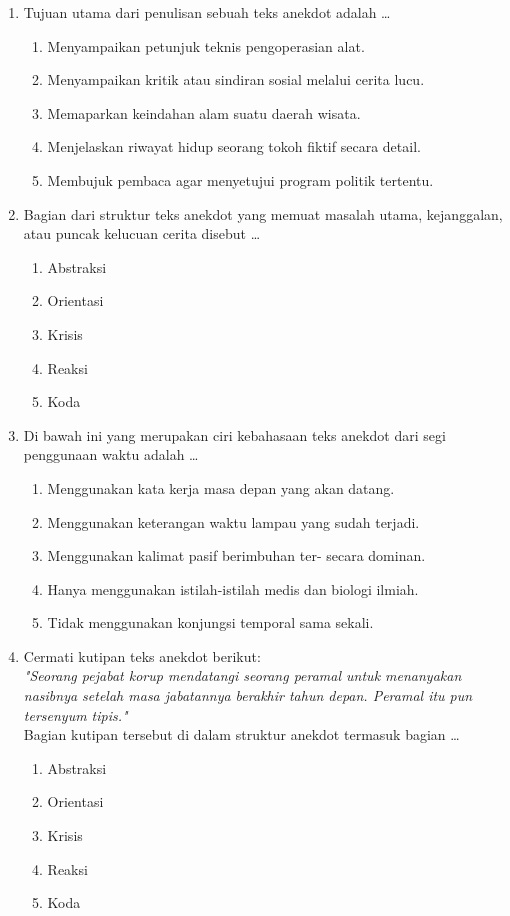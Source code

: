 \documentclass[12pt,a4paper]{article}
\begin{document}
\begin{enumerate}[leftmargin=*]

\item Tujuan utama dari penulisan sebuah teks anekdot adalah \dots
    \begin{enumerate}[label=\alph*.]
        \item Menyampaikan petunjuk teknis pengoperasian alat.
        \item Menyampaikan kritik atau sindiran sosial melalui cerita lucu.
        \item Memaparkan keindahan alam suatu daerah wisata.
        \item Menjelaskan riwayat hidup seorang tokoh fiktif secara detail.
        \item Membujuk pembaca agar menyetujui program politik tertentu.
    \end{enumerate}

\item Bagian dari struktur teks anekdot yang memuat masalah utama, kejanggalan, atau puncak kelucuan cerita disebut \dots
    \begin{enumerate}[label=\alph*.]
        \item Abstraksi
        \item Orientasi
        \item Krisis
        \item Reaksi
        \item Koda
    \end{enumerate}

\item Di bawah ini yang merupakan ciri kebahasaan teks anekdot dari segi penggunaan waktu adalah \dots
    \begin{enumerate}[label=\alph*.]
        \item Menggunakan kata kerja masa depan yang akan datang.
        \item Menggunakan keterangan waktu lampau yang sudah terjadi.
        \item Menggunakan kalimat pasif berimbuhan ter- secara dominan.
        \item Hanya menggunakan istilah-istilah medis dan biologi ilmiah.
        \item Tidak menggunakan konjungsi temporal sama sekali.
    \end{enumerate}

\item Cermati kutipan teks anekdot berikut:\\
\textit{"Seorang pejabat korup mendatangi seorang peramal untuk menanyakan nasibnya setelah masa jabatannya berakhir tahun depan. Peramal itu pun tersenyum tipis."}\\
Bagian kutipan tersebut di dalam struktur anekdot termasuk bagian \dots
    \begin{enumerate}[label=\alph*.]
        \item Abstraksi
        \item Orientasi
        \item Krisis
        \item Reaksi
        \item Koda
    \end{enumerate}


\end{enumerate}
\end{document}
